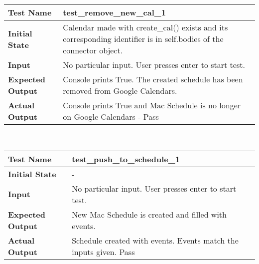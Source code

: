 \documentclass[12pt, titlepage]{article}
\begin{document}
		\begin{table}[!htbp]
			\begin{tabularx}{\textwidth}{|l|X|}%
				\hline
                \textbf{Test Name} & test\_remove\_new\_cal\_1
                \\\hline
                \textbf{Initial State} & Calendar made with create\_cal() exists and its corresponding identifier is in self.bodies of the connector object.
                \\\hline
                \textbf{Input} & No particular input. User presses enter to start test.
                \\\hline 
                \textbf{Expected Output} & Console prints True. The created schedule has been removed from Google Calendars.
                \\\hline
                \textbf{Actual Output} & Console prints True and Mac Schedule is no longer on Google Calendars - Pass
                \\\hline
			\end{tabularx}\\ %
    	\end{table}	
            \hfill	%
		\begin{table}[!htbp]
			\begin{tabularx}{\textwidth}{|l|X|}%
				\hline
                \textbf{Test Name} & test\_push\_to\_schedule\_1
                \\\hline
                \textbf{Initial State} & - 
                \\\hline
                \textbf{Input} & No particular input. User presses enter to start test.
                \\\hline 
                \textbf{Expected Output} & New Mac Schedule is created and filled with events.
                \\\hline
                \textbf{Actual Output} & Schedule created with events. Events match the inputs given. Pass
                \\\hline
			\end{tabularx}\\ %
    	\end{table}	
            \hfill	%
\end{document}
